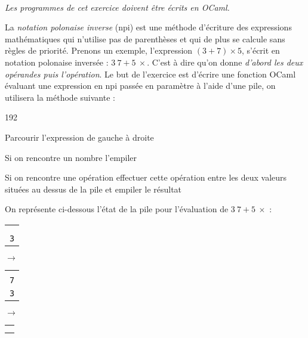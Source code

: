 \documentclass[11pt,a4paper]{article}
\begin{document}
\begin{Exercise}[title = {Piles et notation polonaise inverse}] \\
	\textit{Les programmes de cet exercice doivent être écrits en OCaml.}

	\smallskip
	La \textit{notation polonaise inverse} ({\sc npi}) est une méthode d'écriture des expressions mathématiques qui n'utilise pas de parenthèses et qui de plus se calcule sans règles de priorité. Prenons un exemple, l'expression $(3+7)\times5$, s'écrit en notation polonaise inversée : $3\ 7 + 5\ \times$. C'est à dire qu'on donne \textit{d'abord les deux opérandes puis l'opération}.
	Le but de l'exercice est d'écrire une fonction OCaml évaluant une expression en {\sc npi} passée en paramètre à l'aide d'une pile, on utilisera la méthode suivante  :
	\begin{dingautolist}{192}
		\item Parcourir l'expression de gauche à droite
		\item Si on rencontre un nombre l'empiler
		\item Si on rencontre une opération effectuer cette opération entre les deux valeurs situées au dessus de la pile et empiler le résultat
	\end{dingautolist}
	On représente ci-dessous l'état de la pile pour l'évaluation de $3\ 7 + 5\ \times$ :
	\begin{center}
		\begin{tabular}{|>{\centering\arraybackslash}p{1cm}|}
			\hline
			{\tt }  \\
			\hline
			{\tt }  \\
			\hline
			{\tt }  \\
			\hline
			{\tt 3} \\
			\hline
		\end{tabular} \qquad $\longrightarrow $ \qquad
		\begin{tabular}{|>{\centering\arraybackslash}p{1cm}|}
			\hline
			{\tt }  \\
			\hline
			{\tt }  \\
			\hline
			{\tt 7} \\
			\hline
			{\tt 3} \\
			\hline
		\end{tabular}
		\qquad $\longrightarrow $ \qquad
		\begin{tabular}{|>{\centering\arraybackslash}p{1cm}|}
			\hline
			{\tt }   \\
			\hline
			{\tt }   \\
			\hline
			{\tt }   \\

\end{tabular}
\end{center}
\end{Exercise}
\end{document}
